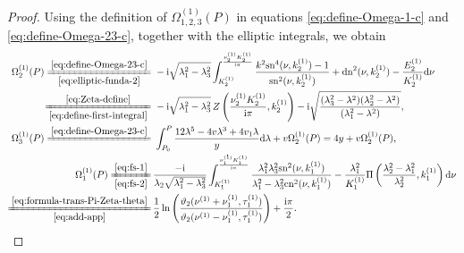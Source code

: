 \documentclass[11pt,reqno]{amsart}
\newcommand{\ii}{\mathrm{i}}
\newcommand{\sn}{\mathrm{sn}}
\newcommand{\cn}{\mathrm{cn}}
\newcommand{\dn}{\mathrm{dn}}
\newcommand{\dd}{\mathrm{d}}
\numberwithin{equation}{section}
\begin{document}
\begin{proof}
	Using the definition of $\Omega_{1,2,3}^{(1)}(P)$ in equations \eqref{eq:define-Omega-1-c} and \eqref{eq:define-Omega-23-c}, together with the elliptic integrals, we obtain
	\begin{equation}\label{eq:define-Omega-123-P}
		\begin{split}
			\Omega_2^{(1)}(P)
			\xlongequal[\eqref{eq:elliptic-funda-2}]{\eqref{eq:define-Omega-23-c}}&\ 
			-\ii \sqrt{\lambda_1^2-\lambda_3^2} \int_{   K^{(1)}_2}^{\frac{ \nu^{(1)} _2  K^{(1)}_2}{\ii \pi}}  \frac{k^2\sn^4(\nu,  k^{(1)}_2)-1}{\sn^2(\nu,  k^{(1)}_2)}+\dn^2(\nu,  k^{(1)}_2)-\frac{ E^{(1)}_2}{  K^{(1)}_2}\dd \nu\\
			\xlongequal[\eqref{eq:define-first-integral}]{\eqref{eq:Zeta-define}}&\ 
			 -\ii \sqrt{\lambda_1^2-\lambda_3^2}\, Z\left(\frac{ \nu^{(1)} _2  K^{(1)}_2}{\ii\pi},  k^{(1)}_2\right)-\ii \sqrt{\frac{(\lambda_3^2-\lambda^2)(\lambda_2^2-\lambda^2)}{(\lambda_1^2-\lambda^2)}},\\
			\Omega_3^{(1)}(P)\xlongequal{\eqref{eq:define-Omega-23-c}}&\ 
			\int_{P_0}^{P}\frac{12\lambda^5-4v\lambda^3+4v_1\lambda}{y}\dd \lambda+v\Omega_2^{(1)}(P)=
			4y+v\Omega_2^{(1)}(P),\\
			\Omega_1^{(1)}(P)
			\xlongequal[\eqref{eq:fs-2}]{\eqref{eq:fs-1}}&\, \frac{-\ii }{\lambda_2\sqrt{\lambda_1^2-\lambda_3^2}}	\int_{  K^{(1)}_1}^{\frac{ \nu^{(1)} _1  K^{(1)}_1}{\ii \pi}}\frac{\lambda_1^2\lambda_3^2\sn^2(\nu,  k^{(1)}_1)}{\lambda_1^2-\lambda_3^2\cn^2(\nu,  k^{(1)}_1)}-\frac{\lambda_1^2}{  K^{(1)}_1}\Pi\left( \frac{\lambda_2^2-\lambda_1^2}{\lambda_2^2},  k^{(1)}_1 \right) \dd \nu\\
			\xlongequal[\eqref{eq:add-app}]{\eqref{eq:formula-trans-Pi-Zeta-theta}}&\, \frac{1}{2}\ln\left(\frac{\vartheta_2( \nu^{(1)}+ \nu^{(1)} _1 ,  \tau^{(1)}_1)}{\vartheta_2( \nu^{(1)} - \nu^{(1)}_1 ,  \tau^{(1)}_1)}\right)+\frac{\ii \pi}{2}.	
		\end{split}
	\end{equation}
	

\end{proof}
\end{document}
